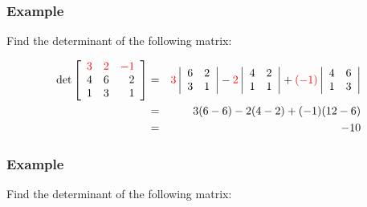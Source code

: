 \begin{frame}
  \frametitle{Example}

  Find the determinant of the following matrix:

  \begin{eqnarray*}
    \mathrm{det}
    \left[ \begin{array}{rrr} {\color{red}3} & {\color{red}2} & {\color{red}-1} \\ 4 & 6 & 2 \\ 1 & 3 & 1 \end{array} \right]
    & = &
    {\color{red}3} \left| \begin{array}{rr} 6 & 2 \\ 3 & 1 \end{array} \right| - {\color{red}2} \left| \begin{array}{rr} 4 & 2 \\ 1 & 1 \end{array} \right|
    + {\color{red}(-1)} \left| \begin{array}{rr} 4 & 6 \\ 1 & 3 \end{array} \right| \\
    & = & 3 (6-6) - 2(4-2) + (-1) (12-6) \\
    & = & -10
  \end{eqnarray*}

\end{frame}




\begin{frame}
  \frametitle{Example}
  Find the determinant of the following matrix:






\end{frame}


